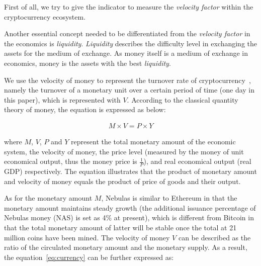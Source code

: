 First of all, we try to give the indicator to measure the \emph{velocity factor} within the cryptocurrency ecosystem. 

Another essential concept needed to be differentiated from the \emph{velocity factor} in the economics is \emph{liquidity}. \emph{Liquidity} describes the difficulty level in exchanging the assets for the medium of exchange. As money itself is a medium of exchange in economics, money is the assets with the best \emph{liquidity}.


We use the velocity of money to represent the turnover rate of cryptocurrency~\cite{selden}, namely the turnover of a monetary unit over a certain period of time (one day in this paper), which is represented with $V$. According to the classical quantity theory of money, the equation is expressed as below:

\begin{align}
M\times V=P\times Y
\label{eq:currency}
\end{align}

\noindent where $M$, $V$, $P$ and $Y$ represent the total monetary amount of the economic system, the velocity of money, the price level (measured by the money of unit economical output, thus the money price is $\frac{1}{P}$), and real economical output (real GDP) respectively. The equation illustrates that the product of monetary amount and velocity of money equals the product of price of goods and their output.

As for the monetary amount $M$, Nebulas is similar to Ethereum in that the monetary amount maintains steady growth (the additional issuance percentage of Nebulas money (NAS) is set as 4\% at present), which is different from Bitcoin in that the total monetary amount of latter will be stable once the total at 21 million coins have been mined. The velocity of money $V$ can be described as the ratio of the circulated monetary amount and the monetary supply. As a result, the equation~\ref{eq:currency} can be further expressed as:

